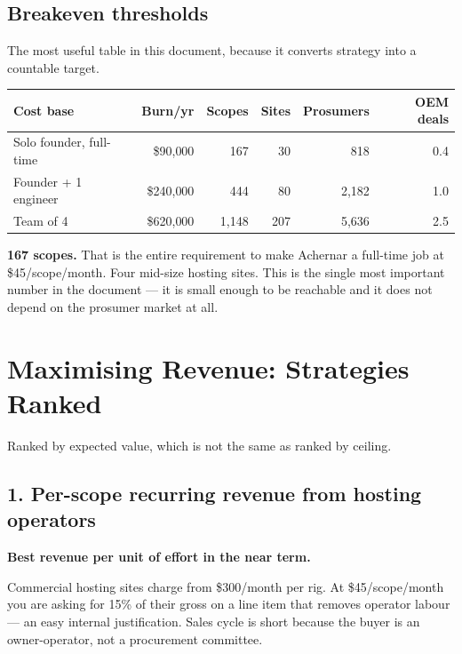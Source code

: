 \documentclass[11pt]{article}
\newcommand{\dollar}[1]{\$#1}
\begin{document}
\subsection{Breakeven thresholds}

The most useful table in this document, because it converts strategy into a
countable target.

\begin{center}
\small
\begin{tabular}{@{}lrrrrr@{}}
\toprule
\textbf{Cost base} & \textbf{Burn/yr} & \textbf{Scopes} & \textbf{Sites} & \textbf{Prosumers} & \textbf{OEM deals} \\
\midrule
Solo founder, full-time & \dollar{90{,}000} & 167 & 30 & 818 & 0.4 \\
Founder + 1 engineer & \dollar{240{,}000} & 444 & 80 & 2{,}182 & 1.0 \\
Team of 4 & \dollar{620{,}000} & 1{,}148 & 207 & 5{,}636 & 2.5 \\
\bottomrule
\end{tabular}
\end{center}

\begin{keybox}
\textbf{167 scopes.} That is the entire requirement to make Achernar a
full-time job at \dollar{45}/scope/month. Four mid-size hosting sites. This is
the single most important number in the document --- it is small enough to be
reachable and it does not depend on the prosumer market at all.
\end{keybox}

\section{Maximising Revenue: Strategies Ranked}

Ranked by expected value, which is not the same as ranked by ceiling.

\subsection{1. Per-scope recurring revenue from hosting operators}

\textbf{Best revenue per unit of effort in the near term.}

Commercial hosting sites charge from \dollar{300}/month per rig. At
\dollar{45}/scope/month you are asking for 15\% of their gross on a line item
that removes operator labour --- an easy internal justification. Sales cycle is
short because the buyer is an owner-operator, not a procurement committee.
\end{document}
